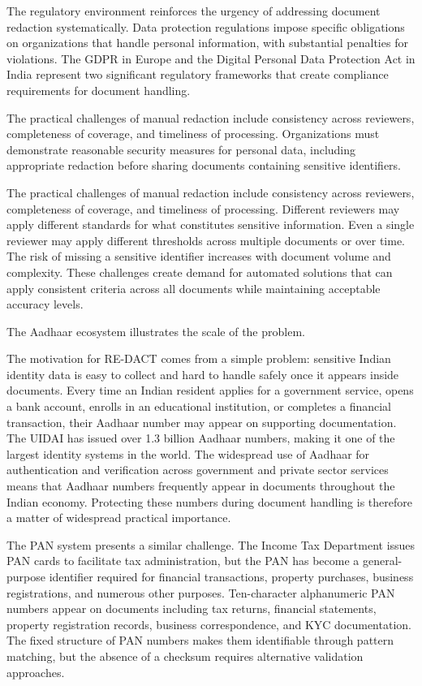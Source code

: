 The regulatory environment reinforces the urgency of addressing document redaction systematically. Data protection regulations impose specific obligations on organizations that handle personal information, with substantial penalties for violations. The GDPR in Europe and the Digital Personal Data Protection Act in India represent two significant regulatory frameworks that create compliance requirements for document handling.

\bigskip

The practical challenges of manual redaction include consistency across reviewers, completeness of coverage, and timeliness of processing. Organizations must demonstrate reasonable security measures for personal data, including appropriate redaction before sharing documents containing sensitive identifiers.

The practical challenges of manual redaction include consistency across reviewers, completeness of coverage, and timeliness of processing. Different reviewers may apply different standards for what constitutes sensitive information. Even a single reviewer may apply different thresholds across multiple documents or over time. The risk of missing a sensitive identifier increases with document volume and complexity. These challenges create demand for automated solutions that can apply consistent criteria across all documents while maintaining acceptable accuracy levels.

\bigskip

The Aadhaar ecosystem illustrates the scale of the problem.

\bigskip

The motivation for RE-DACT comes from a simple problem: sensitive Indian identity data is easy to collect and hard to handle safely once it appears inside documents. Every time an Indian resident applies for a government service, opens a bank account, enrolls in an educational institution, or completes a financial transaction, their Aadhaar number may appear on supporting documentation. The UIDAI has issued over 1.3 billion Aadhaar numbers, making it one of the largest identity systems in the world. The widespread use of Aadhaar for authentication and verification across government and private sector services means that Aadhaar numbers frequently appear in documents throughout the Indian economy. Protecting these numbers during document handling is therefore a matter of widespread practical importance.

The PAN system presents a similar challenge. The Income Tax Department issues PAN cards to facilitate tax administration, but the PAN has become a general-purpose identifier required for financial transactions, property purchases, business registrations, and numerous other purposes. Ten-character alphanumeric PAN numbers appear on documents including tax returns, financial statements, property registration records, business correspondence, and KYC documentation. The fixed structure of PAN numbers makes them identifiable through pattern matching, but the absence of a checksum requires alternative validation approaches.

